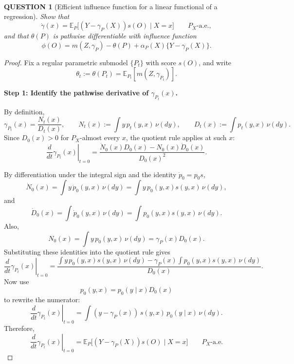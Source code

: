 \documentclass[12pt]{article}
\renewcommand{\(}{\left(}%
\renewcommand{\)}{\right)}%
\renewcommand{\[}{\left[}%
\renewcommand{\]}{\right]}%
\newtheorem{question}{QUESTION}[section]}
\newtheorem{proof}{Proof.}}
\begin{document}
\begin{question}[Efficient influence function for a linear functional of a regression]
Show that
\begin{equation*}
\dot\gamma(x)
=
\mathbb{E}_P\big[(Y-\gamma_P(X))s(O)\mid X=x\big]
\qquad
P_X\text{-a.e.},
\end{equation*}
and that $\theta(P)$ is pathwise differentiable with influence function
\begin{equation*}
\phi(O)
=
m(Z,\gamma_P)-\theta(P)+\alpha_P(X)\{Y-\gamma_P(X)\}.
\end{equation*}
\end{question}

\begin{proof}
Fix a regular parametric submodel $\{P_t\}$ with score $s(O)$, and write
\begin{equation*}
\theta_t:=\theta(P_t)=\mathbb{E}_{P_t}[m(Z,\gamma_{P_t})].
\end{equation*}

\medskip
\textbf{Step 1: Identify the pathwise derivative of $\gamma_{P_t}(x)$.}

By definition,
\begin{equation*}
\gamma_{P_t}(x)
=
\frac{N_t(x)}{D_t(x)},
\qquad
N_t(x):=\int y\,p_t(y,x)\,\nu(dy),
\qquad
D_t(x):=\int p_t(y,x)\,\nu(dy).
\end{equation*}
Since $D_0(x)>0$ for $P_X$-almost every $x$, the quotient rule applies at such $x$:
\begin{equation*}
\left.\frac{d}{dt}\gamma_{P_t}(x)\right|_{t=0}
=
\frac{\dot N_0(x)D_0(x)-N_0(x)\dot D_0(x)}{D_0(x)^2}.
\end{equation*}

By differentiation under the integral sign and the identity $\dot p_0=p_0s$,
\begin{equation*}
\dot N_0(x)
=
\int y\,\dot p_0(y,x)\,\nu(dy)
=
\int y\,p_0(y,x)s(y,x)\,\nu(dy),
\end{equation*}
and
\begin{equation*}
\dot D_0(x)
=
\int \dot p_0(y,x)\,\nu(dy)
=
\int p_0(y,x)s(y,x)\,\nu(dy).
\end{equation*}
Also,
\begin{equation*}
N_0(x)=\int y\,p_0(y,x)\,\nu(dy)=\gamma_P(x)D_0(x).
\end{equation*}
Substituting these identities into the quotient rule gives
\begin{equation*}
\left.\frac{d}{dt}\gamma_{P_t}(x)\right|_{t=0}
=
\frac{\int y\,p_0(y,x)s(y,x)\,\nu(dy)-\gamma_P(x)\int p_0(y,x)s(y,x)\,\nu(dy)}{D_0(x)}.
\end{equation*}
Now use
\begin{equation*}
p_0(y,x)=p_0(y\mid x)D_0(x)
\end{equation*}
to rewrite the numerator:
\begin{equation*}
\left.\frac{d}{dt}\gamma_{P_t}(x)\right|_{t=0}
=
\int (y-\gamma_P(x))\,s(y,x)\,p_0(y\mid x)\,\nu(dy).
\end{equation*}
Therefore,
\begin{equation*}
\left.\frac{d}{dt}\gamma_{P_t}(x)\right|_{t=0}
=
\mathbb{E}_P\big[(Y-\gamma_P(X))s(O)\mid X=x\big]
\qquad
P_X\text{-a.e.}
\end{equation*}


\end{proof}
\end{document}
